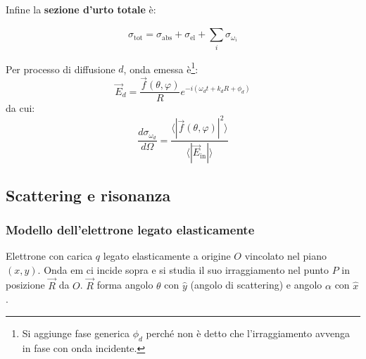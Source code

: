 \documentclass[10pt, a4paper]{scrartcl}
\numberwithin{equation}{subsection}
\theoremstyle{style1}
\newenvironment{boxenv}[1][]{
    \begin{eqbox}[#1]
    }{
   \end{eqbox}
}
\begin{document}
\noindent Infine la \textbf{sezione d'urto totale} \`e:
\begin{boxenv}[]
\begin{equation}
	\sigma _\text{tot}= \sigma _\text{abs} + \sigma _{\text{el}} +\sum_{i}^{} \sigma _{\omega_i} 
\end{equation}
\end{boxenv}
\noindent Per processo di diffusione $d$, onda emessa \`e\footnote{Si aggiunge fase generica $\phi _d$ perch\'e non \`e detto che l'irraggiamento avvenga in fase con onda incidente.}:
\begin{equation}
	\vec{E}_d = \frac{\vec{f}(\theta ,\varphi )}{R}e^{-i(\omega_d t + k_dR + \phi _d)} 
\end{equation}
da cui:
\begin{equation}
	\frac{d \sigma _{\omega_d} }{d \Omega } = \frac{\langle|\vec{f}(\theta, \varphi )|^2\rangle}{\langle|\vec{E}_\text{in}|\rangle}
\end{equation}


\subsection{Scattering e risonanza}

\subsubsection{Modello dell'elettrone legato elasticamente}
Elettrone con carica $q$ legato elasticamente a origine $O$ vincolato nel piano $(x,y)$. Onda em ci incide sopra e si studia il suo irraggiamento nel punto $P$ in posizione $\vec{R}$ da $O$. $\vec{R}$ forma angolo $\theta $ con $\hat{y}$ (angolo di scattering) e angolo $\alpha $ con $\hat{x}$. 
\end{document}

